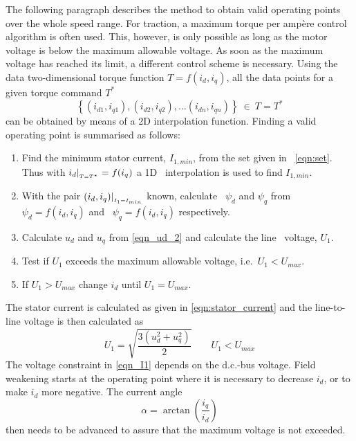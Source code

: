 The following paragraph describes the method to obtain valid operating points over the whole speed range. For traction, a maximum torque per amp\`ere control algorithm is often used. This, however, is only possible as long as the motor voltage is below the maximum allowable voltage. As soon as the maximum voltage has reached its limit, a different control scheme is necessary. Using the data two-dimensional torque function $T=f(i_{d},i_{q})$, all the data points for a given torque command $T^{*}$
\begin{equation}\label{eqn:set}
  \left\{(i_{d1},i_{q1}),(i_{d2},i_{q2}),\ldots(i_{dn},i_{qn})\right\}\: \in \: T=T^{*}
\end{equation} 
can be obtained by means of a 2D interpolation function. Finding a valid operating point is summarised as follows:
\begin{enumerate}
  \item Find the minimum stator current, $I_{1,min}$, from the set given in~%
  \eqref{eqn:set}. Thus with $i_{d}\arrowvert_{_{T=T^{*}}}=f(i_{q})$ a 1D~%
  interpolation is used to find $I_{1,min}$.
  \item With the pair $(i_{d},i_{q}){\arrowvert_{_{I_{1}=I_{min}}}}$ known, calculate~%
  $\psi_{d}$ and $\psi_{q}$ from $\psi_{d}=f(i_{d},i_{q})$ and~%
  $\psi_{q}=f(i_{d},i_{q})$ respectively.
  \item Calculate $u_{d}$ and $u_{q}$ from \eqref{eqn_ud_2} and calculate the line~%
  voltage, $U_{1}$.
  \item Test if $U_{1}$ exceeds the maximum allowable voltage, i.e.~$U_{1}<U_{max}$. 
  \item If $U_{1}>U_{max}$ change $i_{d}$ until $U_{1}=U_{max}$.
\end{enumerate}
The stator current is calculated as given in \eqref{eqn:stator_current} and the line-to-line voltage is then calculated as
\begin{equation} 
  \label{eqn_I1}
  U_{1} = \sqrt{\frac{3\left(u_{d}^2+u_{q}^2\right)}{2}} \qquad U_{1}<U_{max}
\end{equation}
The voltage constraint in \eqref{eqn_I1} depends on the d.c.-bus voltage. Field weakening starts at the operating point where it is necessary to decrease $i_{d}$, or to make $i_{d}$ more negative. The current angle
\begin{equation}
  \alpha = \arctan\left(\frac{i_{q}}{i_{d}}\right)
\end{equation} 
then needs to be advanced to assure that the maximum voltage is not exceeded. 

